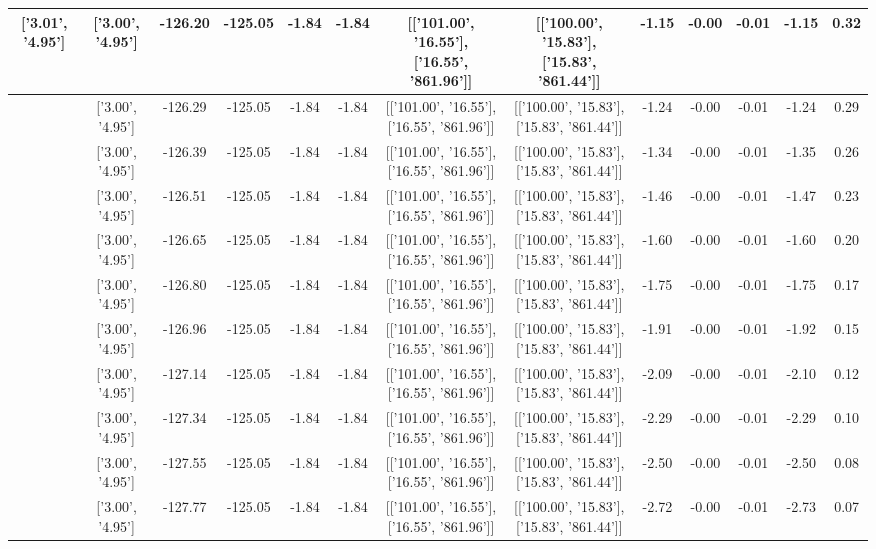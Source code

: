 \begin{table}[htbp]
\begin{adjustbox}{angle=90}
\begin{tabular}{|c|c|c|c|c|c|c|c|c|c|c|c|c|}
 ['3.01', '4.95'] & ['3.00', '4.95'] & -126.20 & -125.05 & -1.84 & -1.84 & [['101.00', '16.55'], ['16.55', '861.96']] & [['100.00', '15.83'], ['15.83', '861.44']] & -1.15 & -0.00 & -0.01 & -1.15 & 0.32\\ \hline
 ['3.01', '4.95'] & ['3.00', '4.95'] & -126.29 & -125.05 & -1.84 & -1.84 & [['101.00', '16.55'], ['16.55', '861.96']] & [['100.00', '15.83'], ['15.83', '861.44']] & -1.24 & -0.00 & -0.01 & -1.24 & 0.29\\ \hline
 ['3.01', '4.95'] & ['3.00', '4.95'] & -126.39 & -125.05 & -1.84 & -1.84 & [['101.00', '16.55'], ['16.55', '861.96']] & [['100.00', '15.83'], ['15.83', '861.44']] & -1.34 & -0.00 & -0.01 & -1.35 & 0.26\\ \hline
 ['3.01', '4.95'] & ['3.00', '4.95'] & -126.51 & -125.05 & -1.84 & -1.84 & [['101.00', '16.55'], ['16.55', '861.96']] & [['100.00', '15.83'], ['15.83', '861.44']] & -1.46 & -0.00 & -0.01 & -1.47 & 0.23\\ \hline
 ['3.01', '4.95'] & ['3.00', '4.95'] & -126.65 & -125.05 & -1.84 & -1.84 & [['101.00', '16.55'], ['16.55', '861.96']] & [['100.00', '15.83'], ['15.83', '861.44']] & -1.60 & -0.00 & -0.01 & -1.60 & 0.20\\ \hline
 ['3.01', '4.95'] & ['3.00', '4.95'] & -126.80 & -125.05 & -1.84 & -1.84 & [['101.00', '16.55'], ['16.55', '861.96']] & [['100.00', '15.83'], ['15.83', '861.44']] & -1.75 & -0.00 & -0.01 & -1.75 & 0.17\\ \hline
 ['3.01', '4.95'] & ['3.00', '4.95'] & -126.96 & -125.05 & -1.84 & -1.84 & [['101.00', '16.55'], ['16.55', '861.96']] & [['100.00', '15.83'], ['15.83', '861.44']] & -1.91 & -0.00 & -0.01 & -1.92 & 0.15\\ \hline
 ['3.01', '4.95'] & ['3.00', '4.95'] & -127.14 & -125.05 & -1.84 & -1.84 & [['101.00', '16.55'], ['16.55', '861.96']] & [['100.00', '15.83'], ['15.83', '861.44']] & -2.09 & -0.00 & -0.01 & -2.10 & 0.12\\ \hline
 ['3.02', '4.95'] & ['3.00', '4.95'] & -127.34 & -125.05 & -1.84 & -1.84 & [['101.00', '16.55'], ['16.55', '861.96']] & [['100.00', '15.83'], ['15.83', '861.44']] & -2.29 & -0.00 & -0.01 & -2.29 & 0.10\\ \hline
 ['3.02', '4.95'] & ['3.00', '4.95'] & -127.55 & -125.05 & -1.84 & -1.84 & [['101.00', '16.55'], ['16.55', '861.96']] & [['100.00', '15.83'], ['15.83', '861.44']] & -2.50 & -0.00 & -0.01 & -2.50 & 0.08\\ \hline
 ['3.02', '4.96'] & ['3.00', '4.95'] & -127.77 & -125.05 & -1.84 & -1.84 & [['101.00', '16.55'], ['16.55', '861.96']] & [['100.00', '15.83'], ['15.83', '861.44']] & -2.72 & -0.00 & -0.01 & -2.73 & 0.07\\ \hline

\end{tabular}
\end{adjustbox}
\end{table}

